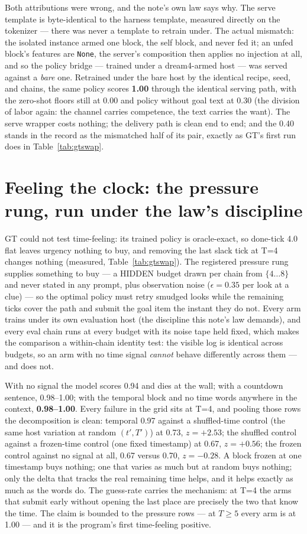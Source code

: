 \documentclass[11pt]{article}
\begin{document}
Both attributions were wrong, and the note's own law says why. The
serve template is byte-identical to the harness template, measured
directly on the tokenizer --- there was never a template to retrain
under. The actual mismatch: the isolated instance armed one block, the
self block, and never fed it; an unfed block's features are
\texttt{None}, the server's composition then applies no injection at
all, and so the policy bridge --- trained under a dream4-armed host ---
was served against a \emph{bare} one. Retrained under the bare host by
the identical recipe, seed, and chains, the same policy scores
\textbf{1.00} through the identical serving path, with the zero-shot
floors still at 0.00 and policy without goal text at 0.30 (the
division of labor again: the channel carries competence, the text
carries the want). The serve wrapper costs nothing; the delivery path
is clean end to end; and the 0.40 stands in the record as the
mismatched half of its pair, exactly as GT's first run does in
Table~\ref{tab:gtswap}.

\section{Feeling the clock: the pressure rung, run under the law's discipline}

GT could not test time-feeling: its trained policy is oracle-exact, so
done-tick 4.0 flat leaves urgency nothing to buy, and removing the
last slack tick at T=4 changes nothing (measured,
Table~\ref{tab:gtswap}). The registered pressure rung supplies
something to buy --- a HIDDEN budget drawn per chain from $\{4\dots8\}$
and never stated in any prompt, plus observation noise
($\epsilon=0.35$ per look at a clue) --- so the optimal policy must
retry smudged looks while the remaining ticks cover the path and
submit the goal item the instant they do not. Every arm trains under
its own evaluation host (the discipline this note's law demands), and
every eval chain runs at every budget with its noise tape held fixed,
which makes the comparison a within-chain identity test: the visible
log is identical across budgets, so an arm with no time signal
\emph{cannot} behave differently across them --- and does not.

With no signal the model scores 0.94 and dies at the wall; with a
countdown sentence, 0.98--1.00; with the temporal block and no time
words anywhere in the context, \textbf{0.98--1.00}. Every failure in
the grid sits at T=4, and pooling those rows the decomposition is
clean: temporal 0.97 against a shuffled-time control (the same host
variation at random $(t',T')$) at 0.73, $z=+2.53$; the shuffled
control against a frozen-time control (one fixed timestamp) at 0.67,
$z=+0.56$; the frozen control against no signal at all, 0.67 versus
0.70, $z=-0.28$. A block frozen at one timestamp buys nothing; one
that varies as much but at random buys nothing; only the delta that
tracks the real remaining time helps, and it helps exactly as much as
the words do. The guess-rate carries the mechanism: at T=4 the arms
that submit early without opening the last place are precisely the two
that know the time. The claim is bounded to the pressure rows --- at
$T\ge5$ every arm is at 1.00 --- and it is the program's first
time-feeling positive.
\end{document}
